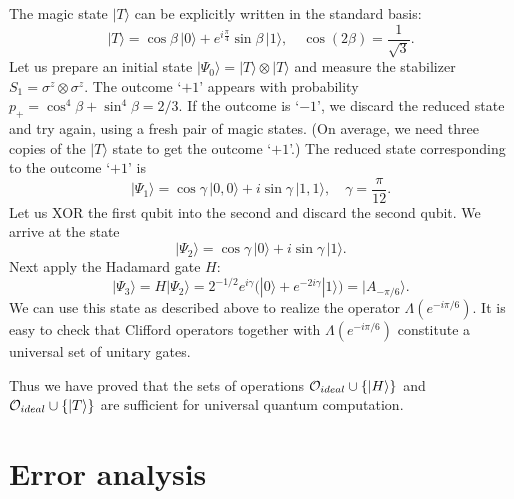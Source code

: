\documentclass[pra,twocolumn,showpacs]{revtex4}
\newcommand{\calO}{{\cal O }}
\newcommand{\ra}{\rangle}
\newcommand{\sm}{\sigma}
\begin{document}
The magic state $|T\ra$ can be explicitly written in the standard basis:
\begin{equation}
\label{T-state}
|T\ra = \cos\beta\, |0\ra + e^{i\frac{\pi}4} \sin\beta\, |1\ra, \quad
\cos{(2\beta)}=\frac1{\sqrt{3}}.
\end{equation}
Let us prepare an initial state $|\Psi_0\ra=|T\ra\otimes|T\ra$ and measure the
stabilizer $S_1=\sm^z\otimes\sm^z$.  The outcome `$+1$' appears with probability
$p_+=\cos^{4}\beta + \sin^{4}\beta = 2/3$.  If the outcome is `$-1$', we discard
the reduced state and try again, using a fresh pair of magic states.  (On 
average, we need three copies of the $|T\ra$ state to get the outcome `$+1$'.)
The reduced state corresponding to the outcome `$+1$' is
\[
|\Psi_1\ra=\cos{\gamma}\,|0,0\ra + i\sin{\gamma}\,|1,1\ra, \quad
\gamma=\frac{\pi}{12}.
\]
Let us XOR the first qubit into the second and discard the second qubit.
We arrive at the state
\[
|\Psi_2\ra=\cos{\gamma}\,|0\ra + i\sin{\gamma}\,|1\ra.
\]
Next apply the Hadamard gate $H$:
\[
|\Psi_3\ra = H|\Psi_2\ra =
2^{-1/2} e^{i\gamma} \bigl(|0\ra + e^{-2i\gamma}|1\ra\bigr)=|A_{-\pi/6}\ra.
\]
We can use this state as described above to realize the operator
$\Lambda(e^{-i\pi/6})$.  It is easy to check that Clifford operators together
with $\Lambda(e^{-i\pi/6})$ constitute a universal set of unitary gates.

Thus we have proved that the sets of operations
$\calO_{ideal}\cup\{|H\rangle\}$ and $\calO_{ideal}\cup\{|T\rangle\}$ are
sufficient for universal quantum computation.


\section{\label{sec:connection} Error analysis}
\end{document}
